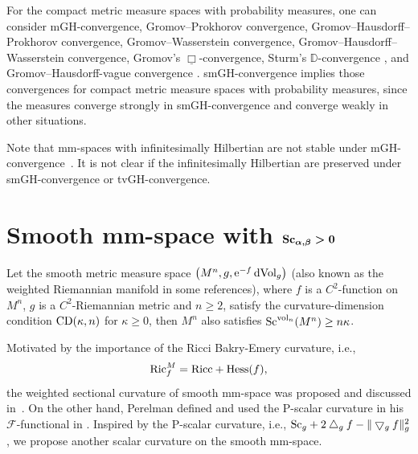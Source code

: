 \documentclass[10pt,a4paper]{amsart}
\begin{document}
\begin{Remark}
For the compact metric measure spaces with probability measures, one can consider mGH-convergence, Gromov--Prokhorov convergence, Gromov--Hausdorff--Prokhorov convergence, Gromov--Wasserstein convergence, Gromov--Hausdorff--Wasserstein convergence, Gromov's
$\underline{\Box}$-convergence, Sturm's $\mathbb{D}$-convergence \cite[Section~27]{MR2459454}, and Gromov--Hausdorff-vague convergence \cite{MR3522292}. smGH-convergence implies those convergences for compact metric measure spaces with probability measures, since the measures converge strongly in smGH-convergence and converge weakly in other situations.

Note that mm-spaces with infinitesimally Hilbertian are not stable under mGH-conver\-gen\-ce~\cite{MR3381131}. It is not clear if the infinitesimally Hilbertian are preserved under smGH-convergence or tvGH-convergence.
\end{Remark}

\section[Smooth mm-space with Sc(alpha,beta)>0]{Smooth mm-space with $\boldsymbol{{\rm Sc}_{\alpha, \beta}>0}$}\label{smooth mm-space}
 Let the smooth metric measure space $\big(M^n, g, {\rm e}^{-f}\,{\rm dVol}_g\big)$ (also known as the weighted Riemannian manifold in some references), where $f$ is a $C^2$-function on $M^n$, $g$ is a $C^2$-Riemannian metric and $n \geq 2$, satisfy the curvature-dimension condition ${\rm CD}(\kappa, n)$ for $\kappa\geq 0$, then $M^n$ also satisfies ${\rm Sc}^{{\rm vol}_n}(M^n)\geq n\kappa$.

 Motivated by the importance of the Ricci Bakry-Emery curvature, i.e.,
 \begin{gather*}
 {\rm Ric}^M_f= {\rm Ricc} +{\rm Hess}(f),
 \end{gather*}
 the weighted sectional curvature of smooth mm-space was proposed and discussed in~\cite{MR3397488}. On the other hand, Perelman defined and used the P-scalar curvature in his $\mathcal{F}$-functional in \cite[Section~1]{2002math.....11159P}. Inspired by the P-scalar curvature, i.e., $ {\rm Sc}_g + 2\bigtriangleup_gf - \|\bigtriangledown_gf\|^2_g$, we propose another scalar curvature on the smooth mm-space.
\end{document}

